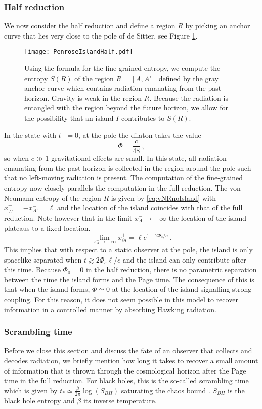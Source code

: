 \documentclass[a4paper,11pt]{article}
\newcommand{\beq}{\begin{equation}}
\newcommand{\eeq}{\end{equation}}
\numberwithin{equation}{section}
\begin{document}
\subsubsection*{Half reduction}
%
We now consider the half reduction and define a region $R$ by picking an anchor curve that lies very close to the pole of de Sitter, see Figure \ref{fig:PenroseIslandHalf}.
%
\begin{figure}[h]
\centering
\texttt{[image: PenroseIslandHalf.pdf]}
\caption{Using the formula for the fine-grained entropy, we compute the entropy $S(R)$ of the region $R=[A,A']$ defined by the gray anchor curve which contains radiation emanating from the past horizon. Gravity is weak in the region $R$. Because the radiation is entangled with the region beyond the future horizon, we allow for the possibility that an island $I$ contributes to $S(R)$.}
\label{fig:PenroseIslandHalf}
\end{figure}
%
In the state with $t_+=0$, at the pole the dilaton takes the value
\beq
\Phi = \frac{c}{48} ~,
\eeq
so when $c\gg 1$ gravitational effects are small. In this state, all radiation emanating from the past horizon is collected in the region around the pole such that no left-moving radiation is present. The computation of the fine-grained entropy now closely parallels the computation in the full reduction. The von Neumann entropy of the region $R$ is given by \eqref{eq:vNRnoIsland} with $x^+_{A'}=-x^-_{A'}=\ell$ and the location of the island coincides with that of the full reduction. Note however that in the limit $x^-_A \to-\infty$ the location of the island plateaus to a fixed location.
\beq
\lim_{x_A^-\to-\infty}x_{\partial I}^+ = \ell e^{1+2\Phi_s/c} ~.
\eeq
This implies that with respect to a static observer at the pole, the island is only spacelike separated when $t \gtrsim 2\Phi_s\ell/c$ and the island can only contribute after this time. Because $\Phi_0=0$ in the half reduction, there is no parametric separation between the time the island forms and the Page time. The consequence of this is that when the island forms, $\Phi\simeq 0$ at the location of the island signalling strong coupling. For this reason, it does not seem possible in this model to recover information in a controlled manner by absorbing Hawking radiation. 

\subsubsection*{Scrambling time}
%
Before we close this section and discuss the fate of an observer that collects and decodes radiation, we briefly mention how long it takes to recover a small amount of information that is thrown through the cosmological horizon after the Page time in the full reduction. For black holes, this is the so-called scrambling time \cite{Sekino:2008he,Hayden:2007cs,Shenker:2013pqa} which is given by $t_*\simeq \frac{\beta}{2\pi}\log(S_{BH})$ saturating the chaos bound \cite{Maldacena:2015waa}. $S_{BH}$ is the black hole entropy and $\beta$ its inverse temperature.
\end{document}
